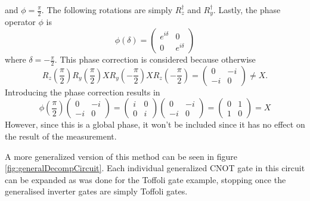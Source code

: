 \documentclass[../../../dissertation.tex]{subfiles}
\begin{document}
and $\phi = \frac{\pi}{2}$. The following rotations are simply $R_z^\dagger$ and $R_y^\dagger$. Lastly, the phase operator $\phi$ is 
\begin{equation}
	\phi(\delta) = \begin{pmatrix}
		e^{i\delta} & 0 \\
		0 & e^{i\delta}
		 \end{pmatrix}
\end{equation}
where $\delta = -\frac{\pi}{2}$. This phase correction is considered because otherwise
\begin{equation}
	R_z(\frac{\pi}{2})R_y(\frac{\pi}{2})XR_y(-\frac{\pi}{2})XR_z(-\frac{\pi}{2}) = 
	\begin{pmatrix}
		0 & -i \\
		-i & 0
		 \end{pmatrix} \neq X.
\end{equation}
Introducing the phase correction results in
\begin{equation}
	\phi(\frac{\pi}{2}) 
	\begin{pmatrix}
		0 & -i \\
		-i & 0
		 \end{pmatrix} =  
	\begin{pmatrix}
		i & 0 \\
		0 & i
		 \end{pmatrix}   
	\begin{pmatrix}
		0 & -i \\
		-i & 0
		 \end{pmatrix} =   
	\begin{pmatrix}
		0 & 1 \\
		1 & 0
		 \end{pmatrix} = X  
\end{equation}
However, since this is a global phase, it won't be included since it has no effect on the result of the measurement.\par
A more generalized version of this method can be seen in figure \ref{fig:generalDecompCircuit}. Each individual generalized CNOT gate in this circuit can be expanded as was done for the Toffoli gate example, stopping once the generalised inverter gates are simply Toffoli gates.
\end{document}
